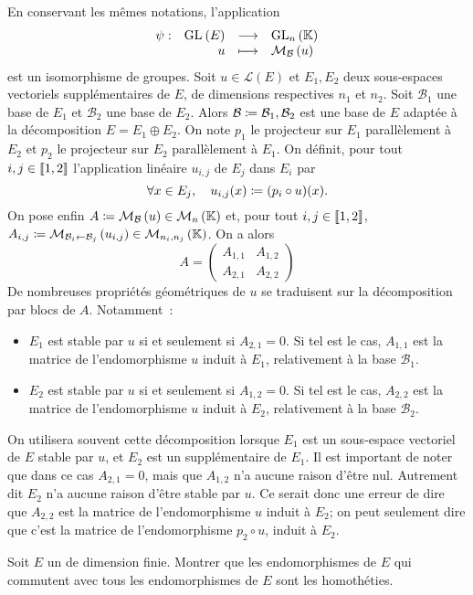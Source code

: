\documentclass{magnolia}
\begin{document}
\begin{remarqueUnique}
\remarque En conservant les mêmes notations, l'application
  \[\begin{array}[t]{lrcl} \displaystyle{\psi} : & \displaystyle{{\rm GL}_{}\left(E\right)} & \longrightarrow & \displaystyle{{\rm GL}_{n}\left(\ensuremath{\mathbb{K}}\right)} \\ & \displaystyle{u} & \longmapsto & \displaystyle{\mathcal{M}_{\mathcal{B}}\left(u\right)} \end{array}\]
  est un isomorphisme de groupes.
\remarque
Soit $u\in\mathcal{L}(E)$ et $E_1, E_2$ deux sous-espaces vectoriels
supplémentaires de $E$, de dimensions respectives $n_1$ et $n_2$. Soit $\mathcal{B}_1$ une base de $E_1$ et
$\mathcal{B}_2$ une base de $E_2$. Alors $\mathcal{B}\coloneqq\mathcal{B}_1,\mathcal{B}_2$ est une base de $E$
adaptée à la décomposition $E=E_1\oplus E_2$. On note $p_1$ le projecteur sur $E_1$ parallèlement à $E_2$
et $p_2$ le projecteur sur $E_2$ parallèlement à $E_1$. On définit, pour tout $i,j\in\left\llbracket 1,2\right\rrbracket$ l'application
linéaire $u_{i,j}$ de $E_j$ dans $E_i$ par
\[\forall x\in E_j,\quad u_{i,j}(x)\coloneqq (p_i\circ u)(x).\]
On pose enfin $A\coloneqq\mathcal{M}_{\mathcal{B}}\left(u\right)\in\mathcal{M}_{n}\left(\mathbb{K}\right)$ et, pour tout $i,j\in\left\llbracket 1,2\right\rrbracket$,
$A_{i,j}\coloneqq\mathcal{M}_{\mathcal{B}_i\gets\mathcal{B}_j}\left(u_{i,j}\right)\in\mathcal{M}_{n_i,n_j}\left(\mathbb{K}\right)$. On a alors
\[A=\begin{pmatrix}A_{1,1}&A_{1,2}\\A_{2,1}&A_{2,2}\end{pmatrix}\]
De nombreuses propriétés géométriques de $u$ se traduisent sur la décomposition par blocs de $A$. Notamment~:
\begin{itemize}
\item $E_1$ est stable par $u$ si et seulement si $A_{2,1}=0$. Si tel est le cas, $A_{1,1}$ est la matrice de
  l'endomorphisme $u$ induit à $E_1$, relativement à la base $\mathcal{B}_1$.
\item $E_2$ est stable par $u$ si et seulement si $A_{1,2}=0$. Si tel est le cas, $A_{2,2}$ est la matrice de
  l'endomorphisme $u$ induit à $E_2$, relativement à la base $\mathcal{B}_2$.
\end{itemize}
On utilisera souvent cette décomposition lorsque $E_1$ est un sous-espace vectoriel de $E$ stable par $u$, et
$E_2$ est un supplémentaire de $E_1$. Il est important de noter que dans ce cas $A_{2,1}=0$, mais que
$A_{1,2}$ n'a aucune raison d'être nul. Autrement dit $E_2$ n'a aucune raison d'être stable par $u$. Ce serait
donc une erreur de dire que $A_{2,2}$ est la matrice de l'endomorphisme $u$ induit à $E_2$; on peut seulement
dire que c'est la matrice de l'endomorphisme $p_2\circ u$, induit à $E_2$.
\end{remarqueUnique}

\begin{exoUnique}
\exo Soit $E$ un \Kev de dimension finie. Montrer que les endomorphismes de
  $E$ qui commutent avec tous les endomorphismes de $E$ sont les homothéties.
\end{exoUnique}
\end{document}

